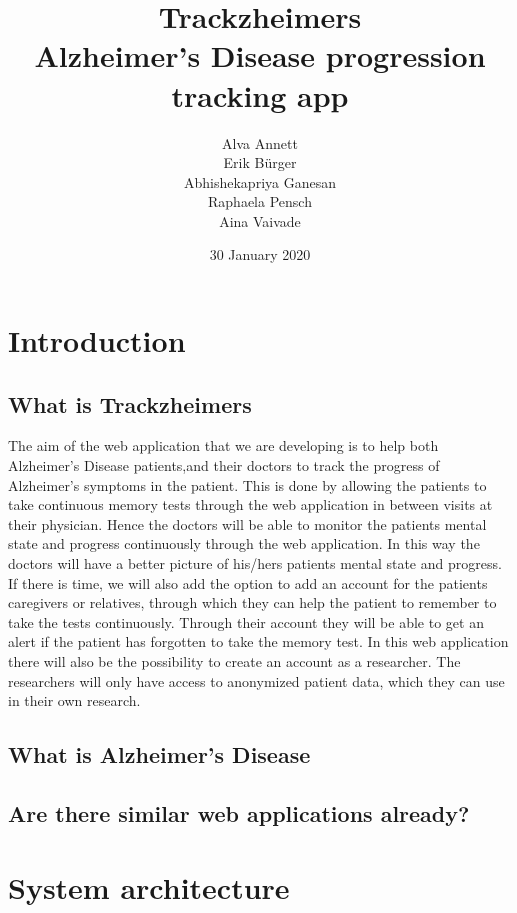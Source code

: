 \documentclass{article}
\title{%
  Trackzheimers \\
  \large  Alzheimer’s Disease progression tracking app}
\author{Alva Annett\\Erik Bürger \\ Abhishekapriya Ganesan\\Raphaela Pensch\\Aina Vaivade}
\date{30 January 2020}
\begin{document}
\maketitle

\section{Introduction}
\subsection{What is Trackzheimers}
The aim of the web application that we are developing is to help both Alzheimer's Disease patients,and their doctors to track the progress of Alzheimer's symptoms in the patient. This is done by allowing the patients to take continuous memory tests through the web application in between visits at their physician. Hence the doctors will be able to monitor the patients mental state and progress continuously through the web application. In this way the doctors will have a better picture of his/hers patients mental state and progress.\newline
\newline If there is time, we will also add the option to add an account for the patients caregivers or relatives, through which they can help the patient to remember to take the tests continuously. Through their account they will be able to get an alert if the patient has forgotten to take the memory test.\newline
\newline In this web application there will also be the possibility to create an account as a researcher. The researchers will only have access to anonymized patient data, which they can use in their own research. %

\subsection{What is Alzheimer's Disease}

\subsection{Are there similar web applications already?}

\section{System architecture}
\end{document}
